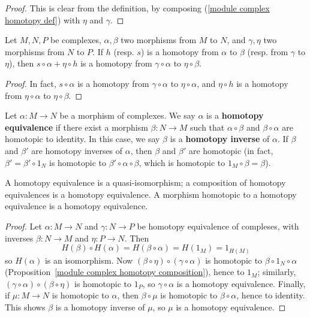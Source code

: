 \begin{proof}
This is clear from the definition, by composing (\ref{module complex homotopy def}) with $\eta$ and $\gamma$.
\end{proof}
\begin{corollary}\label{module complex homotopy composition two step}
Let $M,N,P$ be complexes, $\alpha,\beta$ two morphisms from $M$ to $N$, and $\gamma,\eta$ two morphisms from $N$ to $P$. If $h$ (resp. $s$) is a homotopy from $\alpha$ to $\beta$ (resp. from $\gamma$ to $\eta$), then $s\circ\alpha+\eta\circ h$ is a homotopy from $\gamma\circ\alpha$ to $\eta\circ\beta$. 
\end{corollary}
\begin{proof}
In fact, $s\circ\alpha$ is a homotopy from $\gamma\circ\alpha$ to $\eta\circ\alpha$, and $\eta\circ h$ is a homotopy from $\eta\circ\alpha$ to $\eta\circ\beta$.
\end{proof}
Let $\alpha:M\to N$ be a morphism of complexes. We say $\alpha$ is a \textbf{homotopy equivalence} if there exist a morphism $\beta:N\to M$ such that $\alpha\circ\beta$ and $\beta\circ\alpha$ are homotopic to identity. In this case, we say $\beta$ is a \textbf{homotopy inverse} of $\alpha$. If $\beta$ and $\beta'$ are homotopy inverses of $\alpha$, then $\beta$ and $\beta'$ are homotopic (in fact, $\beta'=\beta'\circ 1_N$ is homotopic to $\beta'\circ\alpha\circ\beta$, which is homotopic to $1_M\circ\beta=\beta$).
\begin{proposition}\label{module complex homotopy equivalence prop}
A homotopy equivalence is a quasi-isomorphism; a composition of homotopy equivalences is a homotopy equivalence. A morphism homotopic to a homotopy equivalence is a homotopy equivalence.
\end{proposition}
\begin{proof}
Let $\alpha:M\to N$ and $\gamma:N\to P$ be homotopy equivalence of compleses, with inverses $\beta:N\to M$ and $\eta:P\to N$. Then
\[H(\beta)\circ H(\alpha)=H(\beta\circ\alpha)=H(1_M)=1_{H(M)}\]
so $H(\alpha)$ is an isomorphism. Now $(\beta\circ\eta)\circ(\gamma\circ\alpha)$ is homotopic to $\beta\circ 1_{N}\circ\alpha$ (Proposition~\ref{module complex homotopy composition}), hence to $1_M$; similarly, $(\gamma\circ\alpha)\circ(\beta\circ\eta)$ is homotopic to $1_P$, so $\gamma\circ\alpha$ is a homotopy equivalence. Finally, if $\mu:M\to N$ is homotopic to $\alpha$, then $\beta\circ\mu$ is homotopic to $\beta\circ\alpha$, hence to identity. This shows $\beta$ is a homotopy inverse of $\mu$, so $\mu$ is a homotopy equivalence.
\end{proof}
